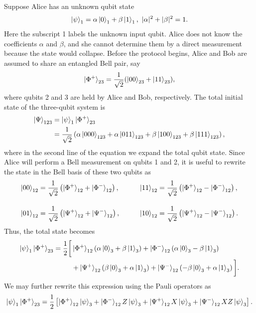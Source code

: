 \documentclass[aps,prd,preprint,floats,epsf,superscriptaddress,nofootinbib]{revtex4}
\begin{document}
Suppose Alice has an unknown qubit state \begin{equation}
  \ket{\psi}_1=\alpha\ket{0}_1+\beta\ket{1}_1,\ |\alpha|^2+|\beta|^2=1.
\end{equation} Here the subscript 1 labels the unknown input qubit. Alice does not know the coefficients $\alpha$ and $\beta$, and she cannot determine them by a direct measurement because the state would collapse. Before the protocol begins, Alice and Bob are assumed to share an entangled Bell pair, say \begin{equation}
  \ket{\Phi^+}_{23}=\frac{1}{\sqrt{2}}(\ket{00}_{23}+\ket{11}_{23}),
\end{equation} where qubits 2 and 3 are held by Alice and Bob, respectively. The total initial state of the three-qubit system is \begin{equation}
  \begin{aligned}
    \ket{\Psi}_{123}&=\ket{\psi}_1\ket{\Phi^+}_{23}\\
    &=\frac{1}{\sqrt{2}}\left(\alpha\ket{000}_{123}+\alpha\ket{011}_{123}+\beta\ket{100}_{123}+\beta\ket{111}_{123}\right),
  \end{aligned}
\end{equation}where in the second line of the equation we expand the total qubit state. Since Alice will perform a Bell measurement on qubits 1 and 2, it is useful to rewrite the state in the Bell basis of these two qubits as \begin{equation}
\begin{aligned}
\ket{00}_{12}
&=
\frac{1}{\sqrt{2}}
\left(
\ket{\Phi^+}_{12}
+
\ket{\Phi^-}_{12}
\right),
&\qquad
\ket{11}_{12}
&=
\frac{1}{\sqrt{2}}
\left(
\ket{\Phi^+}_{12}
-
\ket{\Phi^-}_{12}
\right),
\\[10pt]
\ket{01}_{12}
&=
\frac{1}{\sqrt{2}}
\left(
\ket{\Psi^+}_{12}
+
\ket{\Psi^-}_{12}
\right),
&\qquad
\ket{10}_{12}
&=
\frac{1}{\sqrt{2}}
\left(
\ket{\Psi^+}_{12}
-
\ket{\Psi^-}_{12}
\right).
\end{aligned}
\label{Eq:computational_to_Bell}
\end{equation} Thus, the total state becomes \begin{equation}
\begin{aligned}
\ket{\psi}_1\ket{\Phi^+}_{23}
=
\frac{1}{2}
\bigg[
&\ket{\Phi^+}_{12}
\left(
\alpha\ket{0}_3
+
\beta\ket{1}_3
\right)
+
\ket{\Phi^-}_{12}
\left(
\alpha\ket{0}_3
-
\beta\ket{1}_3
\right)
\\
&+
\ket{\Psi^+}_{12}
\left(
\beta\ket{0}_3
+
\alpha\ket{1}_3
\right)
+
\ket{\Psi^-}_{12}
\left(
-\beta\ket{0}_3
+
\alpha\ket{1}_3
\right)
\bigg].
\end{aligned}
\label{Eq:teleportation_expanded_Bell_basis}
\end{equation} We may further rewrite this expression using the Pauli operators as \begin{equation}
\ket{\psi}_1\ket{\Phi^+}_{23}
=
\frac{1}{2}
\left[
\ket{\Phi^+}_{12}\ket{\psi}_3
+
\ket{\Phi^-}_{12}Z\ket{\psi}_3
+
\ket{\Psi^+}_{12}X\ket{\psi}_3
+
\ket{\Psi^-}_{12}XZ\ket{\psi}_3
\right].
\label{Eq:teleportation_identity}
\end{equation}
\end{document}
